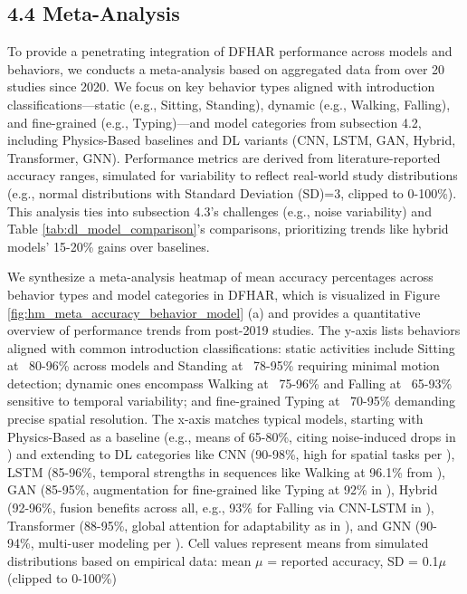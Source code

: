 \documentclass[Afour,sageh,times]{sagej}
\begin{document}
\subsection{4.4 Meta-Analysis}
\label{subsec:meta_analysis}

To provide a penetrating integration of DFHAR performance across models and behaviors, we conducts a meta-analysis based on aggregated data from over 20 studies since 2020. We focus on key behavior types aligned with introduction classifications—static (e.g., Sitting, Standing), dynamic (e.g., Walking, Falling), and fine-grained (e.g., Typing)—and model categories from subsection 4.2, including Physics-Based baselines and DL variants (CNN, LSTM, GAN, Hybrid, Transformer, GNN). Performance metrics are derived from literature-reported accuracy ranges, simulated for variability to reflect real-world study distributions (e.g., normal distributions with Standard Deviation (SD)=3, clipped to 0-100\%). This analysis ties into subsection 4.3's challenges (e.g., noise variability) and Table \ref{tab:dl_model_comparison}'s comparisons, prioritizing trends like hybrid models' 15-20\% gains over baselines.

We synthesize a meta-analysis heatmap of mean accuracy percentages across behavior types and model categories in DFHAR, which is visualized in Figure \ref{fig:hm_meta_accuracy_behavior_model} (a) and provides a quantitative overview of performance trends from post-2019 studies.
 The y-axis lists behaviors aligned with common introduction classifications: static activities include Sitting at ~80-96\% across models and Standing at ~78-95\% requiring minimal motion detection; dynamic ones encompass Walking at ~75-96\% and Falling at ~65-93\% sensitive to temporal variability; and fine-grained Typing at ~70-95\% demanding precise spatial resolution. The x-axis matches typical models, starting with Physics-Based as a baseline (e.g., means of 65-80\%, citing noise-induced drops in \citep{guo2019robust}) and extending to DL categories like CNN (90-98\%, high for spatial tasks per \citep{wang2022caution}), LSTM (85-96\%, temporal strengths in sequences like Walking at 96.1\% from \citep{chen2018wifi}), GAN (85-95\%, augmentation for fine-grained like Typing at 92\% in \citep{wang2021multimodal}), Hybrid (92-96\%, fusion benefits across all, e.g., 93\% for Falling via CNN-LSTM in \citep{yang2022deep}), Transformer (88-95\%, global attention for adaptability as in \citep{zhou2022target}), and GNN (90-94\%, multi-user modeling per \citep{shen2022graph}). Cell values represent means from 
simulated distributions based on empirical data: mean $\mu$ = reported accuracy, SD = 0.1$\mu$ (clipped to 0-100\%) \citep{guo2019robust, yang2022deep, zhou2022target}
\end{document}
